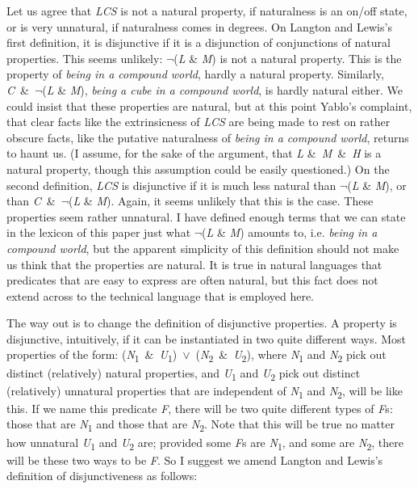 Let us agree that \textit{LCS} is not a natural property, if naturalness is an on/off state, or is very unnatural, if naturalness comes in degrees. On Langton and Lewis's first definition, it is disjunctive if it is a disjunction of conjunctions of natural properties. This seems unlikely: ${\lnot}$(\textit{L} \& \textit{M}) is not a natural property. This is the property of \textit{being in a compound world}, hardly a natural property. Similarly, \textit{C}~\&~${\lnot}$(\textit{L} \& \textit{M}), \textit{being a cube in a compound world}, is hardly natural either. We could insist that these properties are natural, but at this point Yablo's complaint, that clear facts like the extrinsicness of \textit{LCS} are being made to rest on rather obscure facts, like the putative naturalness of \textit{being in a compound world}, returns to haunt us. (I assume, for the sake of the argument, that \textit{L} \&~\textit{M}~\&~\textit{H} is a natural property, though this assumption could be easily questioned.) On the second definition, \textit{LCS} is disjunctive if it is much less natural than ${\lnot}$(\textit{L} \& \textit{M}), or than \textit{C}~\&~${\lnot}$(\textit{L} \& \textit{M}). Again, it seems unlikely that this is the case. These properties seem rather unnatural. I have defined enough terms that we can state in the lexicon of this paper just what ${\lnot}$(\textit{L} \& \textit{M}) amounts to, i.e. \textit{being in a compound world}, but the apparent simplicity of this definition should not make us think that the properties are natural. It is true in natural languages that predicates that are easy to express are often natural, but this fact does not extend across to the technical language that is employed here.

The way out is to change the definition of disjunctive properties. A property is disjunctive, intuitively, if it can be instantiated in two quite different ways. Most properties of the form: (\textit{N}\textsubscript{1}~\&~\textit{U}\textsubscript{1})~${\vee}$~(\textit{N}\textsubscript{2}~\&~\textit{U}\textsubscript{2}), where \textit{N}\textsubscript{1} and \textit{N}\textsubscript{2} pick out distinct (relatively) natural properties, and \textit{U}\textsubscript{1} and \textit{U}\textsubscript{2} pick out distinct (relatively) unnatural properties that are independent of \textit{N}\textsubscript{1} and \textit{N}\textsubscript{2}, will be like this. If we name this predicate \textit{F}, there will be two quite different types of \textit{F}s: those that are \textit{N}\textsubscript{1} and those that are \textit{N}\textsubscript{2}. Note that this will be true no matter how unnatural \textit{U}\textsubscript{1} and \textit{U}\textsubscript{2} are; provided some \textit{F}s are \textit{N}\textsubscript{1}, and some are \textit{N}\textsubscript{2}, there will be these two ways to be \textit{F}. So I suggest we amend Langton and Lewis's definition of disjunctiveness as follows:

